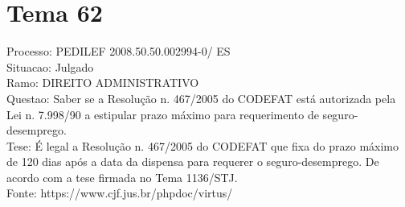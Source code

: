 \documentclass[12pt]{article}
\begin{document}
\section*{Tema 62}
Processo: PEDILEF 2008.50.50.002994-0/ ES\\
Situacao: Julgado\\
Ramo: DIREITO ADMINISTRATIVO\\
Questao: Saber se a Resolução n. 467/2005 do CODEFAT está autorizada pela Lei n. 7.998/90 a estipular prazo máximo para requerimento de seguro-desemprego.\\
Tese: É legal a Resolução n. 467/2005 do CODEFAT que fixa do prazo máximo de 120 dias após a data da dispensa para requerer o seguro-desemprego. De acordo com a tese firmada no Tema 1136/STJ.\\
Fonte: https://www.cjf.jus.br/phpdoc/virtus/
\end{document}
